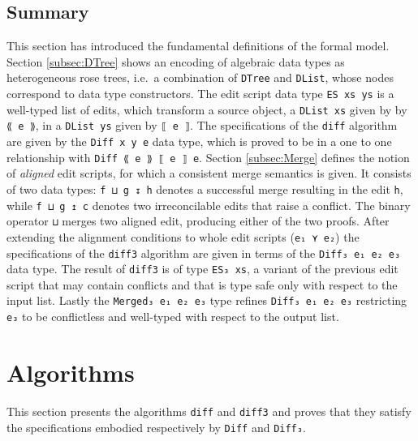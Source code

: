 \documentclass[../Thesis.tex]{subfiles}
\begin{document}
	\subsection{Summary}
	This section has introduced the fundamental definitions
	of the formal model. Section \ref{subsec:DTree} shows an encoding of 	
	algebraic data types as heterogeneous rose trees, i.e.\ a combination of
	\texttt{DTree} and \texttt{DList}, whose nodes correspond
	to data type constructors. The edit script data type \texttt{ES xs ys} is a 
	well-typed list of edits, which 	transform a source object, a \texttt{DList xs} 
	given by by \texttt{⟪ e ⟫}, in a \texttt{DList ys} given by \texttt{⟦ e ⟧}.
	The specifications of the \texttt{diff} algorithm are given by the 
	\texttt{Diff x y e} data type, which is proved to be in a one to one 
	relationship with \texttt{Diff ⟪ e ⟫ ⟦ e ⟧ e}.
	Section \ref{subsec:Merge} defines the notion of \emph{aligned} edit 
	scripts, for which a consistent merge semantics	is given. It consists of two
	data types: \texttt{f ⊔ g ↧ h} denotes a successful merge
	resulting in the edit \texttt{h}, while \texttt{f ⊔ g ↥ c} denotes
	two irreconcilable edits that raise a conflict.
	The binary operator \texttt{⊔} merges two aligned edit, producing
	either of the two proofs.
	After extending the alignment conditions to whole edit scripts 
	(\texttt{e₁ ⋎ e₂}) the specifications of the \texttt{diff3} algorithm
	are given in terms of the \texttt{Diff₃ e₁ e₂ e₃} data type.
	The result of \texttt{diff3} is of type \texttt{ES₃ xs},
	a variant of the previous edit script that may contain
	conflicts and that is type safe only with respect to the input list.
	Lastly the \texttt{Merged₃ e₁ e₂ e₃} type refines \texttt{Diff₃ e₁ e₂ e₃}
	restricting \texttt{e₃} to be conflictless and well-typed with respect to the
	output list.
		
\section{Algorithms}
This section presents the algorithms \texttt{diff} and \texttt{diff3} and proves that they satisfy the specifications embodied respectively by \texttt{Diff} and \texttt{Diff₃}.
\end{document}
